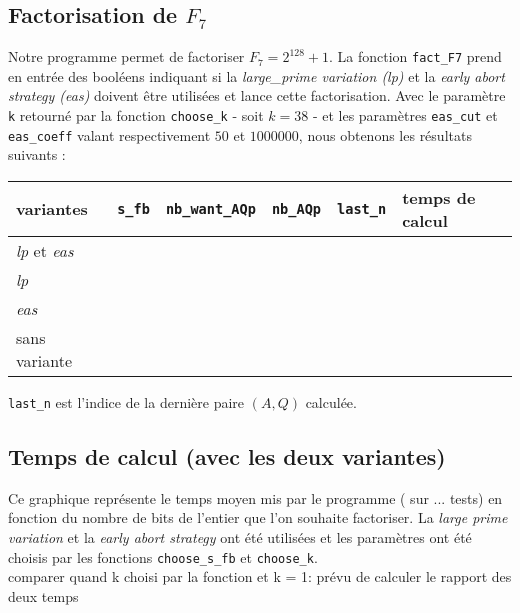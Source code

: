 \subsection{Factorisation de $F_7$}

Notre programme permet de factoriser $F_7 = 2^{128} + 1$. La fonction 
\texttt{fact\_F7} prend en entrée des booléens indiquant si la
\textit{large\_prime variation (lp)} et la \textit{early abort strategy (eas)}
doivent être utilisées et lance cette factorisation. Avec le paramètre \texttt{k}
retourné par la fonction \texttt{choose\_k} - soit $k=38$ - et les paramètres 
\texttt{eas\_cut} et \texttt{eas\_coeff} valant respectivement $50$ et $1000000$,
nous obtenons les résultats suivants :  

\begin{center}
     \begin{tabular}{| l | l| l | l | l | l |}
     \hline
         variantes                    & \texttt{s\_fb} & \texttt{nb\_want\_AQp} &\texttt{nb\_AQp}& \texttt{last\_n}  & temps de calcul  \\ \hline
     \textit{lp} et \textit{eas}      &                &                        &                &                   &                  \\ \hline
     \textit{lp}                      &                &                        &                &                   &                  \\ \hline
     \textit{eas}                     &                &                        &                &                   &                  \\ \hline
     sans variante                    &                &                        &                &                   &                  \\ \hline
    \end{tabular}
\end{center}

\quad \footnotesize{\texttt{last\_n} est l'indice de la dernière paire $(A,Q)$ calculée.}

\subsection{Temps de calcul (avec les deux variantes) }

Ce graphique représente le temps moyen mis par le programme ( sur ... tests)
en fonction du nombre de bits de l'entier que l'on souhaite factoriser. La
\textit{large prime variation} et la \textit{early abort strategy} ont été 
utilisées et les paramètres ont été choisis par les fonctions 
\texttt{choose\_s\_fb} et \texttt{choose\_k}.\\


comparer quand k choisi par la fonction et k = 1: prévu de calculer le rapport des 
deux temps 
